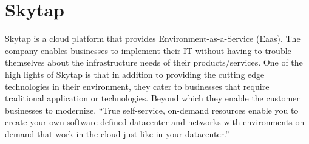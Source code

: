 \section{Skytap}

Skytap is a cloud platform that provides Environment-as-a-Service (Eaas). The
company enables businesses to implement their IT without having to
trouble themselves about the infrastructure needs of their products/services.
One of the high lights of Skytap is that in addition to providing the
cutting edge technologies in their environment, they cater to businesses that
require traditional application or technologies. Beyond which they enable the
customer businesses to modernize. ``True self-service, on-demand resources
enable you to create your own software-defined datacenter and networks with
environments on demand that work in the cloud just like in your 
datacenter.''~\cite{hid-sp18-411-skytap}
